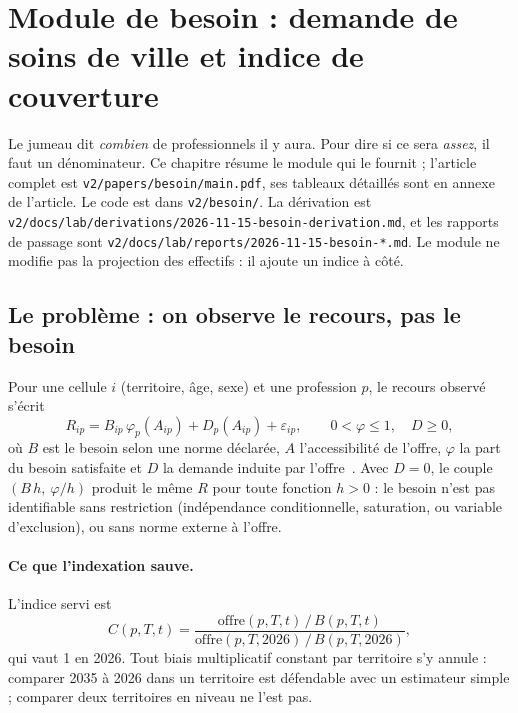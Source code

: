 \begingroup\sloppy\setlength{\emergencystretch}{3em}%

\section{Module de besoin : demande de soins de ville et indice de couverture}\label{sec:besoin-ref}\label{bes:sec}

Le jumeau dit \emph{combien} de professionnels il y aura. Pour dire si ce sera \emph{assez}, il faut un dénominateur.
Ce chapitre résume le module qui le fournit ; l'article complet est \texttt{v2/papers/besoin/main.pdf}, ses tableaux
détaillés sont en annexe de l'article. Le code est dans \texttt{v2/besoin/}. La dérivation est
\texttt{v2/docs/lab/derivations/2026-11-15-besoin-derivation.md}, et les rapports de passage sont
\texttt{v2/docs/lab/reports/2026-11-15-besoin-*.md}. Le module ne modifie pas la projection des effectifs : il
ajoute un indice à côté.

\subsection{Le problème : on observe le recours, pas le besoin}\label{bes:probleme}
Pour une cellule $i$ (territoire, âge, sexe) et une profession $p$, le recours observé s'écrit
\[
R_{ip} = B_{ip}\,\varphi_p(A_{ip}) + D_p(A_{ip}) + \varepsilon_{ip},\qquad 0<\varphi\le 1,\quad D\ge 0,
\]
où $B$ est le besoin selon une norme déclarée, $A$ l'accessibilité de l'offre, $\varphi$ la part du besoin satisfaite
et $D$ la demande induite par l'offre~\citep{evans1974,delattre2003,leonard2009}. Avec $D=0$, le couple
$(B\,h,\ \varphi/h)$ produit le même $R$ pour toute fonction $h>0$\derive{} : le besoin n'est pas identifiable sans
restriction (indépendance conditionnelle, saturation, ou variable d'exclusion), ou sans norme externe à l'offre.

\paragraph{Ce que l'indexation sauve.} L'indice servi est
\[
C(p,T,t)=\frac{\text{offre}(p,T,t)\,/\,B(p,T,t)}{\text{offre}(p,T,2026)\,/\,B(p,T,2026)} ,
\]
qui vaut 1 en 2026. Tout biais multiplicatif constant par territoire s'y annule\derive{} : comparer 2035 à 2026 dans
un territoire est défendable avec un estimateur simple ; comparer deux territoires en niveau ne l'est pas.

